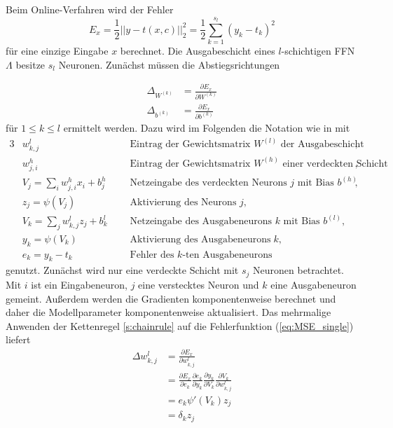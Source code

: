 Beim Online-Verfahren wird der Fehler 
\begin{equation}
    \label{eq:MSE_single}
    E_x= \frac{1}{2} ||y-t(x,c)||_2^2= \frac{1}{2} \sum_{k=1}^{s_l} (y_k-t_k)^2
\end{equation}
für eine einzige Eingabe $x$ berechnet. Die Ausgabeschicht eines $l$-schichtigen FFN $\Lambda$ besitze $s_l$ Neuronen. Zunächst müssen die Abstiegsrichtungen 

\begin{align*}
    \Delta_{W^{(k)}} &= \frac{\partial E_x}{\partial W^{(k)}} \\
    \Delta_{b^{(k)}} &= \frac{\partial E_x}{\partial b^{(k)}} 
\end{align*}
für $1 \leq k \leq l$ ermittelt werden. Dazu wird im Folgenden die Notation wie in \cite{du_diss} mit
\begin{alignat*}{3}
    &w_{k,j}^l  &&\text{Eintrag der Gewichtsmatrix $W^{(l)}$ der Ausgabeschicht}, \\
    &w_{j,i}^h   &&\text{Eintrag der Gewichtsmatrix $W^{(h)}$ einer verdeckten Schicht}, \\
    &V_j=\sum_{i} w_{j,i}^h x_i +b^h_j \; \; \;  &&\text{Netzeingabe des verdeckten Neurons $j$ mit Bias $b^{(h)}$}, \\
    &z_{j}= \psi \left(V_j\right) &&\text{Aktivierung des Neurons $j$},\\
    &V_k=\sum_{j} w_{k,j}^l z_j +b^l_k&&\text{Netzeingabe des Ausgabeneurons $k$ mit Bias $b^{(l)}$}, \\
    &y_k=\psi(V_k) &&\text{Aktivierung des Ausgabeneurons} \; k,\\
    &e_k=y_k-t_k &&\text{Fehler des $k$-ten Ausgabeneurons} 
\end{alignat*}
genutzt. Zunächst wird nur eine verdeckte Schicht mit $s_j$ Neuronen betrachtet. 
Mit $i$ ist ein Eingabeneuron, $j$ eine verstecktes Neuron und $k$ eine Ausgabeneuron gemeint. Außerdem werden die Gradienten komponentenweise berechnet und daher die Modellparameter komponentenweise aktualisiert. Das mehrmalige Anwenden der Kettenregel \ref{s:chainrule} auf die Fehlerfunktion (\ref{eq:MSE_single}) liefert
\begin{align*}
    \label{eq:delta_w_out}
\Delta w_{k,j}^l &= \frac{\partial E_x}{\partial w_{k,j}^l} \\
                 &= \frac{\partial E_x}{\partial e_{k}}
                            \frac{\partial e_k}{\partial y_k} 
                            \frac{\partial y_k}{\partial V_k}
                            \frac{\partial V_k}{\partial w_{k,j}^l}\\
                 &= e_k \psi'(V_k) z_j \\
                 &= \delta_k z_j           
\end{align*} 
